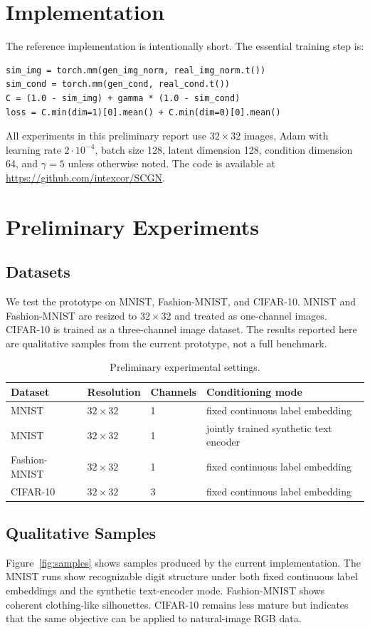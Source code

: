 \documentclass[11pt]{article}
\begin{document}
\section{Implementation}
The reference implementation is intentionally short. The essential training
step is:
\begin{verbatim}
sim_img = torch.mm(gen_img_norm, real_img_norm.t())
sim_cond = torch.mm(gen_cond, real_cond.t())
C = (1.0 - sim_img) + gamma * (1.0 - sim_cond)
loss = C.min(dim=1)[0].mean() + C.min(dim=0)[0].mean()
\end{verbatim}
All experiments in this preliminary report use $32\times32$ images, Adam with
learning rate $2\cdot10^{-4}$, batch size 128, latent dimension 128, condition
dimension 64, and $\gamma=5$ unless otherwise noted. The code is available at
\url{https://github.com/intexcor/SCGN}.

\section{Preliminary Experiments}
\subsection{Datasets}
We test the prototype on MNIST, Fashion-MNIST, and CIFAR-10. MNIST and
Fashion-MNIST are resized to $32\times32$ and treated as one-channel images.
CIFAR-10 is trained as a three-channel image dataset. The results reported here
are qualitative samples from the current prototype, not a full benchmark.

\begin{table}[h]
\centering
\caption{Preliminary experimental settings.}
\begin{tabular}{llll}
\toprule
Dataset & Resolution & Channels & Conditioning mode \\
\midrule
MNIST & $32\times32$ & 1 & fixed continuous label embedding \\
MNIST & $32\times32$ & 1 & jointly trained synthetic text encoder \\
Fashion-MNIST & $32\times32$ & 1 & fixed continuous label embedding \\
CIFAR-10 & $32\times32$ & 3 & fixed continuous label embedding \\
\bottomrule
\end{tabular}
\end{table}

\subsection{Qualitative Samples}
Figure~\ref{fig:samples} shows samples produced by the current implementation.
The MNIST runs show recognizable digit structure under both fixed continuous
label embeddings and the synthetic text-encoder mode. Fashion-MNIST shows
coherent clothing-like silhouettes. CIFAR-10 remains less mature but indicates
that the same objective can be applied to natural-image RGB data.
\end{document}
